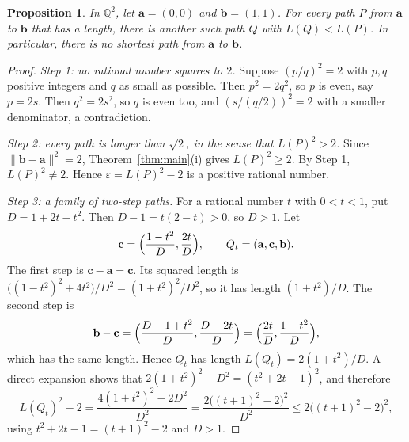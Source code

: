 \documentclass[11pt]{article}
\theoremstyle{plain}
\newtheorem{proposition}[theorem]{Proposition}
\theoremstyle{definition}
\theoremstyle{remark}
\begin{document}
\begin{proposition}\label{prop:noshortest}
In $\mathbb{Q}^2$, let $\mathbf{a} = (0, 0)$ and $\mathbf{b} = (1, 1)$. For every path $P$ from $\mathbf{a}$ to $\mathbf{b}$ that has a length, there is another such path $Q$ with $L(Q) < L(P)$. In particular, there is no shortest path from $\mathbf{a}$ to $\mathbf{b}$.
\end{proposition}
\begin{proof}
\emph{Step 1: no rational number squares to $2$.} Suppose $(p/q)^2 = 2$ with $p, q$ positive integers and $q$ as small as possible. Then $p^2 = 2q^2$, so $p$ is even, say $p = 2s$. Then $q^2 = 2s^2$, so $q$ is even too, and $(s/(q/2))^2 = 2$ with a smaller denominator, a contradiction.

\emph{Step 2: every path is longer than $\sqrt{2}$, in the sense that $L(P)^2 > 2$.} Since $\|\mathbf{b} - \mathbf{a}\|^2 = 2$, Theorem~\ref{thm:main}(i) gives $L(P)^2 \geq 2$. By Step 1, $L(P)^2 \neq 2$. Hence $\varepsilon = L(P)^2 - 2$ is a positive rational number.

\emph{Step 3: a family of two-step paths.} For a rational number $t$ with $0 < t < 1$, put $D = 1 + 2t - t^2$. Then $D - 1 = t(2 - t) > 0$, so $D > 1$. Let
\begin{equation}
    \mathbf{c} = \Bigl( \frac{1 - t^2}{D}, \frac{2t}{D} \Bigr), \qquad Q_t = (\mathbf{a}, \mathbf{c}, \mathbf{b}).
\end{equation}
The first step is $\mathbf{c} - \mathbf{a} = \mathbf{c}$. Its squared length is $\bigl((1 - t^2)^2 + 4t^2\bigr)/D^2 = (1 + t^2)^2/D^2$, so it has length $(1 + t^2)/D$. The second step is
\begin{equation}
    \mathbf{b} - \mathbf{c} = \Bigl( \frac{D - 1 + t^2}{D}, \frac{D - 2t}{D} \Bigr) = \Bigl( \frac{2t}{D}, \frac{1 - t^2}{D} \Bigr),
\end{equation}
which has the same length. Hence $Q_t$ has length $L(Q_t) = 2(1 + t^2)/D$. A direct expansion shows that $2(1+t^2)^2 - D^2 = (t^2 + 2t - 1)^2$, and therefore
\begin{equation}\label{eq:Qt}
    L(Q_t)^2 - 2 = \frac{4(1 + t^2)^2 - 2D^2}{D^2} = \frac{2\bigl((t+1)^2 - 2\bigr)^2}{D^2} \leq 2\bigl((t+1)^2 - 2\bigr)^2,
\end{equation}
using $t^2 + 2t - 1 = (t+1)^2 - 2$ and $D > 1$.


\end{proof}
\end{document}
